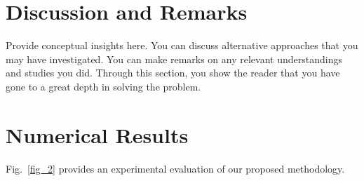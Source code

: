 \documentclass[lettersize,journal]{IEEEtran}
\begin{document}

\section{Discussion and Remarks}

Provide conceptual insights here. You can discuss alternative approaches that you may have investigated. You can make remarks on any relevant understandings and studies you did. Through this section, you show the reader that you have gone to a great depth in solving the problem.

\section{Numerical Results}

Fig.~\ref{fig_2} provides an experimental evaluation of our proposed methodology.

\end{document}
